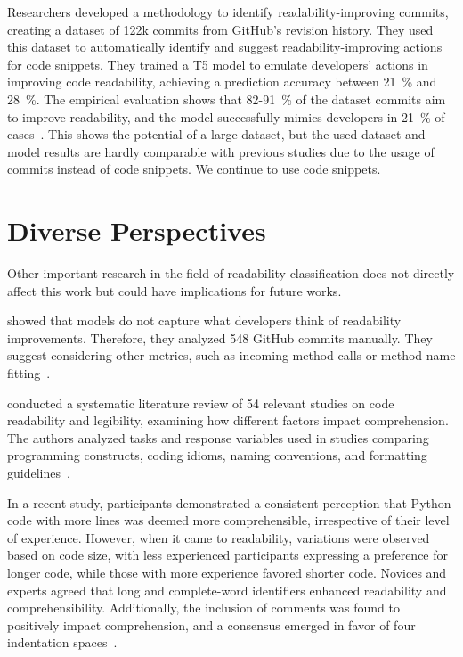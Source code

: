 \documentclass[%
class=scrreprt,
chapterprefix=false,%
open=right,%
twoside=true,%
paper=a4,%
logofile={Logo\_zentral\_farbig\_EN.png},%
thesistype=master,%
UKenglish,%
]{se2thesis}
\theoremstyle{definition}
\begin{document}
	Researchers developed a methodology to identify readability-improving commits, creating a dataset of 122k commits from GitHub's revision history. They used this dataset to automatically identify and suggest readability-improving actions for code snippets. They trained a T5 model to emulate developers' actions in improving code readability, achieving a prediction accuracy between 21~\% and 28~\%. The empirical evaluation shows that 82-91~\% of the dataset commits aim to improve readability, and the model successfully mimics developers in 21~\% of cases~\cite{vitale2023using}.
	This shows the potential of a large dataset, but the used dataset and model results are hardly comparable with previous studies due to the usage of commits instead of code snippets. We continue to use code snippets.
		
	
\section{Diverse Perspectives} \label{Diverse Perspectives}

	Other important research in the field of readability classification does not directly affect this work but could have implications for future works.
	
	\citeauthor{fakhoury2019improving} showed that models do not capture what developers think of readability improvements. Therefore, they analyzed 548 GitHub commits manually. They suggest considering other metrics, such as incoming method calls or method name fitting~\cite{fakhoury2019improving}.	
	
	\citeauthor{oliveira2020evaluating} conducted a systematic literature review of 54 relevant studies on code readability and legibility, examining how different factors impact comprehension. The authors analyzed tasks and response variables used in studies comparing programming constructs, coding idioms, naming conventions, and formatting guidelines~\cite{oliveira2020evaluating}.
	
	In a recent study, participants demonstrated a consistent perception that Python code with more lines was deemed more comprehensible, irrespective of their level of experience. However, when it came to readability, variations were observed based on code size, with less experienced participants expressing a preference for longer code, while those with more experience favored shorter code. Novices and experts agreed that long and complete-word identifiers enhanced readability and comprehensibility. Additionally, the inclusion of comments was found to positively impact comprehension, and a consensus emerged in favor of four indentation spaces~\cite{ribeiro2018attributes}.
	
\end{document}

